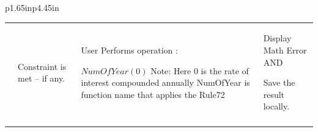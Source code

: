 \documentclass[12pt]{article}
\begin{document}
\begin{table}[H]
\begin{tabular}{p{1.65in}p{4.45in}}
{\begin{table}[H]
\begin{tabular}{p{1.36in}p{1.36in}p{1.36in}p{1.36in}}
\hhline{----}
\multicolumn{1}{|p{1.36in}}{T\_L-US10\_2} & 
\multicolumn{1}{|p{1.36in}}{Constraint is met – if any.} & 
\multicolumn{1}{|p{1.36in}}{User Performs operation :  \par $NumOfYear(0)$ Note: Here 0 is the rate of interest compounded annually
NumOfYear is function name that applies the Rule72} & 
\multicolumn{1}{|p{1.36in}|}{Display Math Error AND  \par Save the result locally.} \\
\hhline{----}

\end{tabular}
 \end{table}
\par } \\
\hhline{--}
 \\
\hhline{--}
 \\
\hhline{--}

\end{tabular}
 \end{table}
\end{document}
